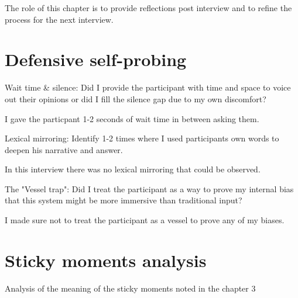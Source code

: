 
The role of this chapter is to provide reflections post interview and to refine the process for the next interview.

\section{Defensive self-probing}

\begin{QandA}
   \item Wait time \& silence: Did I provide the participant with time and space to voice out their opinions or did I fill the silence gap due to my own discomfort?
        \begin{answered}
            I gave the particpant 1-2 seconds of wait time in between asking them.
        \end{answered}

   \item Lexical mirroring: Identify 1-2 times where I used participants own words to deepen his narrative and answer.

        \begin{answered}
        In this interview there was no lexical mirroring that could be observed.
        \end{answered}

    \item The "Vessel trap": Did I treat the participant as a way to prove my internal bias that this system might be more immersive than traditional input?

        \begin{answered}
            I made sure not to treat the participant as a vessel to prove any of my biases.
        \end{answered}
\end{QandA}

\section{Sticky moments analysis}
Analysis of the meaning of the sticky moments noted in the chapter 3


